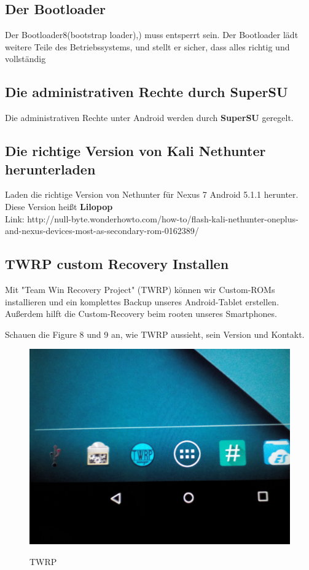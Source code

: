 \documentclass[11pt,a4paper]{article}
\begin{document}
\subsection{Der Bootloader}
Der Bootloader8(bootstrap loader),) muss entsperrt sein.
Der Bootloader lädt weitere Teile des Betriebssystems, und stellt er sicher, dass alles richtig und vollständig

\subsection{Die administrativen Rechte durch SuperSU}
Die administrativen Rechte unter Android werden durch \textbf{SuperSU} geregelt.

\subsection{Die richtige Version von Kali Nethunter herunterladen}
Laden die richtige Version von Nethunter für Nexus 7 Android 5.1.1 herunter. Diese Version heißt \textbf{Lilopop} \\

Link: http://null-byte.wonderhowto.com/how-to/flash-kali-nethunter-oneplus-and-nexus-devices-most-as-secondary-rom-0162389/

\subsection{TWRP custom Recovery Installen}
Mit  "Team Win Recovery Project" (TWRP) können wir Custom-ROMs installieren und ein komplettes Backup unseres Android-Tablet erstellen. Außerdem hilft die Custom-Recovery beim rooten unseres Smartphones.

Schauen die Figure 8 und 9 an, wie TWRP aussieht, sein Version und Kontakt. \\

\begin{figure}[H]
\begin{center} \includegraphics[scale=0.1]{./Image/img8}  \\
\caption{TWRP}
\end{center}
\end{figure} 
\end{document}
